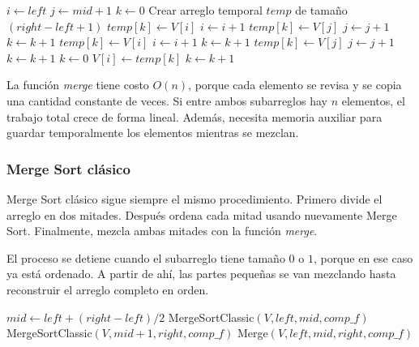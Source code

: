 \begin{algorithm}
    \caption{Merge $\triangleright$ $V[left..right]$}
    \label{alg:merge_function}
    \begin{algorithmic}[1]
        \State $i \gets left$
        \State $j \gets mid + 1$
        \State $k \gets 0$
        \State Crear arreglo temporal $temp$ de tamaño $(right - left + 1)$
        \State $temp[k] \gets V[i]$
        \State $i \gets i + 1$
        \Else
        \State $temp[k] \gets V[j]$
        \State $j \gets j + 1$
        \EndIf
        \State $k \gets k + 1$
        \EndWhile
        \State $temp[k] \gets V[i]$
        \State $i \gets i + 1$
        \State $k \gets k + 1$
        \EndWhile
        \State $temp[k] \gets V[j]$
        \State $j \gets j + 1$
        \State $k \gets k + 1$
        \EndWhile
        \State $k \gets 0$
        \State $V[i] \gets temp[k]$
        \State $k \gets k + 1$
        \EndFor
        \EndProcedure
    \end{algorithmic}
\end{algorithm}

La función \textit{merge} tiene costo $O(n)$, porque cada elemento se revisa y se copia una cantidad constante de veces. Si entre ambos subarreglos hay $n$ elementos, el trabajo total crece de forma lineal. Además, necesita memoria auxiliar para guardar temporalmente los elementos mientras se mezclan.

\subsubsection{Merge Sort clásico}

Merge Sort clásico sigue siempre el mismo procedimiento. Primero divide el arreglo en dos mitades. Después ordena cada mitad usando nuevamente Merge Sort. Finalmente, mezcla ambas mitades con la función \textit{merge}.

El proceso se detiene cuando el subarreglo tiene tamaño $0$ o $1$, porque en ese caso ya está ordenado. A partir de ahí, las partes pequeñas se van mezclando hasta reconstruir el arreglo completo en orden.

\begin{algorithm}
    \caption{Merge Sort clásico $\triangleright$ $V[left..right]$}
    \label{alg:merge_sort_classic}
    \begin{algorithmic}[1]
        \State \Return {}
        \EndIf
        \State $mid \gets left + (right - left) / 2$
        \State MergeSortClassic$(V, left, mid, comp\_f)$ 
        \State MergeSortClassic$(V, mid + 1, right, comp\_f)$ 
        \State Merge$(V, left, mid, right, comp\_f)$ 
        \EndProcedure
    \end{algorithmic}
\end{algorithm}


